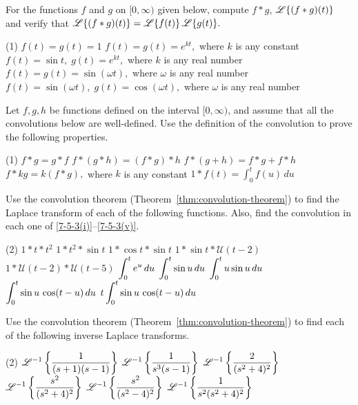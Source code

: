\begin{Exercise}\label{EX75}
	\vspace{-\baselineskip}%
	
	\Question\label{7-5-1}
For the functions $f$ and $g$ on $[0, \infty)$ given below, compute $f\ast g$, $\mathscr{L}\{(f\ast g)(t) \}$ and verify that $\mathscr{L}\{(f\ast g)(t) \} =\mathscr{L}\{f(t)\}\, \mathscr{L}\{g(t)\}.$
	
	\begin{tasks}(1)
		\task $ f(t) = g(t) = 1$ 
		\task $ f(t) = g(t) = e^{kt},$ where $k$ is any constant   
		\task $ f(t) = \sin t,\; g(t) = e^{kt},$ where $k$ is any real number
		\task $ f(t)= g(t) = \sin (\omega t),$ where $\omega$ is any real number
		\task $ f(t)= \sin(\omega t),\; g(t) = \cos(\omega t),$ where $\omega$ is any real number
	\end{tasks}
	
	\Question \label{7-5-2}
	Let $f, g, h$ be functions defined on the interval $[0, \infty)$, and assume that all the convolutions below are well-defined. Use the definition of the convolution  to prove the following properties.
		\begin{tasks}(1)
				\task\label{7-5-2(i)} $f\ast g= g\ast f$   
				\task $f\ast (g\ast h) = (f\ast g) \ast h$ 
				\task $f \ast (g+h)= f\ast g+ f\ast h$ 
				\task $f\ast k g= k( f\ast g),$ where $k$ is any constant
				\task\label{7-5-2(v)} $1\ast f(t) = \int_0^t f(u) \, du$
			\end{tasks}
	
	
	\Question \label{7-5-3}
	Use the convolution theorem (Theorem~\ref{thm:convolution-theorem}) to find the Laplace transform of  each of the following functions. Also,   find the convolution in  each one of \ref{7-5-3(i)}--\ref{7-5-3(v)}.

	\begin{tasks}(2)
		\task\label{7-5-3(i)}  $1\ast t\ast  t^2$
		\task $1\ast t^2\ast \sin t$
		\task  $1\ast \cos t\ast \sin t$
		\task $1\ast \sin t\ast \mathcal{U} (t-2)$ 
		\task\label{7-5-3(v)} $1\ast \mathcal{U} (t-2)\ast \mathcal{U} (t-5)$ 
		\task $\displaystyle\int_0^t e^u\, du$
		\task $\displaystyle\int_0^t \sin u\, du$
		\task $\displaystyle\int_0^t u\sin u\, du$
		\task $\displaystyle\int_0^t \sin u\,\cos(t-u)\, du$
		\task $\displaystyle t\int_0^t \sin u\,\cos(t-u)\, du$
		
	\end{tasks}
\Question \label{7-5-4}
	Use the convolution theorem (Theorem~\ref{thm:convolution-theorem}) to find each of the following inverse Laplace transforms.
	\begin{tasks}[resume=false](2)
		\task $\displaystyle\mathscr{L}^{-1}\left\{\frac{1}{(s+1)(s-1)}\right\}$
		\task $\displaystyle\mathscr{L}^{-1}\left\{\frac{1}{s^3(s-1)}\right\}$
		\task $\displaystyle\mathscr{L}^{-1}\left\{\frac{2}{(s^2+4)^2}\right\}$
		\task $\displaystyle\mathscr{L}^{-1}\left\{\frac{s^2}{(s^2+4)^2}\right\}$
		\task $\displaystyle\mathscr{L}^{-1}\left\{\frac{s^2}{(s^2-4)^2}\right\}$
		\task $\displaystyle\mathscr{L}^{-1}\left\{\frac{1}{s^2(s^2+4)^2}\right\}$
	\end{tasks}


\end{Exercise}
